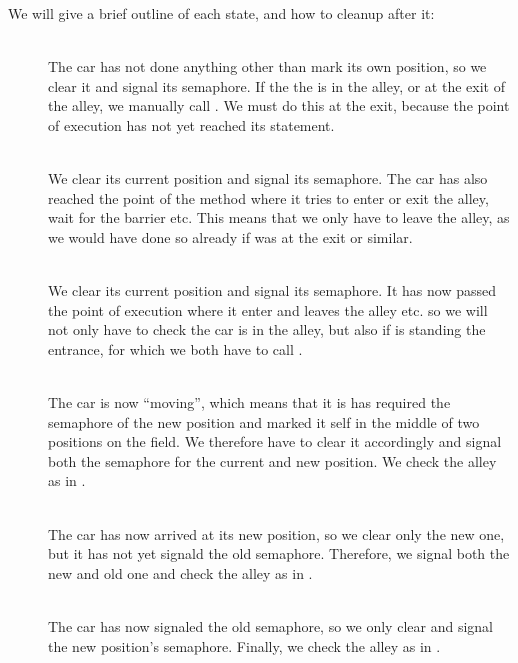 We will give a brief outline of each state, and how to cleanup after it:
\begin{description}
\item[] \ \\
  The car has not done anything other than mark its own position, so
  we clear it and signal its semaphore. If the the is in the alley, or
  at the exit of the alley, we manually call
  . We must do this at the exit, because the
  point of execution has not yet reached its  statement.

\item[] \ \\
  We clear its current position and signal its semaphore. The car has also
  reached the point of the method where it tries to enter or exit the
  alley, wait for the barrier etc. This means that we only have to
  leave the alley, as we would have done so already if was at the
  exit or similar.

\item[] \ \\
  We clear its current position and signal its semaphore. It has now
  passed the point of execution where it enter and leaves the alley
  etc. so we will not only have to check the car is in the alley, but
  also if is standing the entrance, for which we both have to call
  .

\item[] \ \\
  The car is now ``moving'', which means that it is has required the
  semaphore of the new position and marked it self in the middle of
  two positions on the field. We therefore have to clear it
  accordingly and signal both the semaphore for the current and new
  position. We check the alley as in .

\item[] \ \\
  The car has now arrived at its new position, so we clear only the
  new one, but it has not yet signald the old semaphore. Therefore,
  we signal both the new and old one and check the alley as in
  .

\item[] \ \\
  The car has now signaled the old semaphore, so we only clear and
  signal the new position's semaphore. Finally, we check the alley as
  in .
\end{description}

